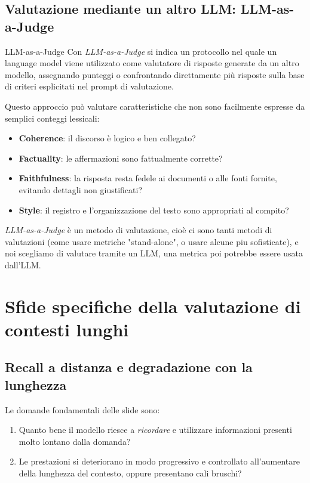 \subsection{Valutazione mediante un altro LLM: LLM-as-a-Judge}

\begin{definition}{LLM-as-a-Judge}
Con \emph{LLM-as-a-Judge} si indica un protocollo nel quale un language model viene utilizzato come valutatore di risposte generate da un altro modello, assegnando punteggi o confrontando direttamente più risposte sulla base di criteri esplicitati nel prompt di valutazione.
\end{definition}

Questo approccio può valutare caratteristiche che non sono facilmente espresse da semplici conteggi lessicali:
\begin{itemize}
\item \textbf{Coherence}: il discorso è logico e ben collegato?
\item \textbf{Factuality}: le affermazioni sono fattualmente corrette?
\item \textbf{Faithfulness}: la risposta resta fedele ai documenti o alle fonti fornite, evitando dettagli non giustificati?
\item \textbf{Style}: il registro e l'organizzazione del testo sono appropriati al compito?
\end{itemize}
\emph{LLM-as-a-Judge} è un metodo di valutazione, cioè ci sono tanti metodi di valutazioni (come usare metriche "stand-alone", o usare alcune piu sofisticate), e noi scegliamo di valutare tramite un LLM, una metrica poi potrebbe essere usata dall'LLM.

\newpage

\section{Sfide specifiche della valutazione di contesti lunghi}

\subsection{Recall a distanza e degradazione con la lunghezza}

Le domande fondamentali delle slide sono:
\begin{enumerate}
\item Quanto bene il modello riesce a \emph{ricordare} e utilizzare informazioni presenti molto lontano dalla domanda?
\item Le prestazioni si deteriorano in modo progressivo e controllato all'aumentare della lunghezza del contesto, oppure presentano cali bruschi?
\end{enumerate}

